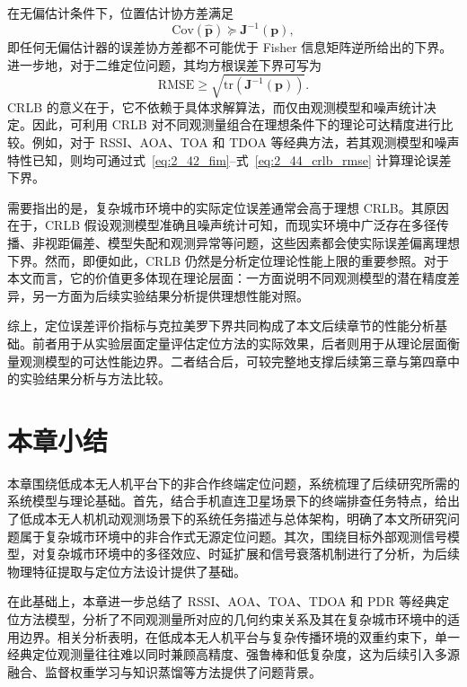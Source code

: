 在无偏估计条件下，位置估计协方差满足
\begin{equation}
\mathrm{Cov}(\hat{\mathbf{p}})
\succeq
\mathbf{J}^{-1}(\mathbf{p}),
\label{eq:2_43_crlb_cov}
\end{equation}
即任何无偏估计器的误差协方差都不可能优于 Fisher 信息矩阵逆所给出的下界。进一步地，对于二维定位问题，其均方根误差下界可写为
\begin{equation}
\mathrm{RMSE}
\ge
\sqrt{
\mathrm{tr}
\left(
\mathbf{J}^{-1}(\mathbf{p})
\right)
}.
\label{eq:2_44_crlb_rmse}
\end{equation}
CRLB 的意义在于，它不依赖于具体求解算法，而仅由观测模型和噪声统计决定。因此，可利用 CRLB 对不同观测量组合在理想条件下的理论可达精度进行比较。例如，对于 RSSI、AOA、TOA 和 TDOA 等经典方法，若其观测模型和噪声特性已知，则均可通过式~\eqref{eq:2_42_fim}--式~\eqref{eq:2_44_crlb_rmse} 计算理论误差下界\cite{Torrieri1984PassiveLocation,Wymeersch2009CooperativeLocalization}。

需要指出的是，复杂城市环境中的实际定位误差通常会高于理想 CRLB。其原因在于，CRLB 假设观测模型准确且噪声统计可知，而现实环境中广泛存在多径传播、非视距偏差、模型失配和观测异常等问题，这些因素都会使实际误差偏离理想下界。然而，即便如此，CRLB 仍然是分析定位理论性能上限的重要参照。对于本文而言，它的价值更多体现在理论层面：一方面说明不同观测模型的潜在精度差异，另一方面为后续实验结果分析提供理想性能对照。

综上，定位误差评价指标与克拉美罗下界共同构成了本文后续章节的性能分析基础。前者用于从实验层面定量评估定位方法的实际效果，后者则用于从理论层面衡量观测模型的可达性能边界。二者结合后，可较完整地支撑后续第三章与第四章中的实验结果分析与方法比较。

\section{本章小结}
\label{sec:2_6}

本章围绕低成本无人机平台下的非合作终端定位问题，系统梳理了后续研究所需的系统模型与理论基础。首先，结合手机直连卫星场景下的终端排查任务特点，给出了低成本无人机机动观测场景下的系统任务描述与总体架构，明确了本文所研究问题属于复杂城市环境中的非合作式无源定位问题。其次，围绕目标外部观测信号模型，对复杂城市环境中的多径效应、时延扩展和信号衰落机制进行了分析，为后续物理特征提取与定位方法设计提供了基础。

在此基础上，本章进一步总结了 RSSI、AOA、TOA、TDOA 和 PDR 等经典定位方法模型，分析了不同观测量所对应的几何约束关系及其在复杂城市环境中的适用边界。相关分析表明，在低成本无人机平台与复杂传播环境的双重约束下，单一经典定位观测量往往难以同时兼顾高精度、强鲁棒和低复杂度，这为后续引入多源融合、监督权重学习与知识蒸馏等方法提供了问题背景。

